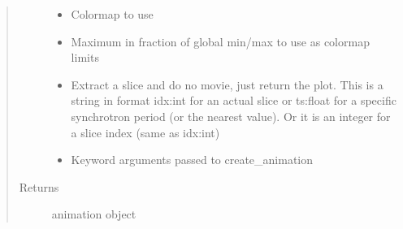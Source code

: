 \documentclass[letterpaper,10pt,openany,oneside,english]{sphinxmanual}
\begin{document}
\begin{fulllineitems}
\begin{fulllineitems}
\begin{quote}
\begin{description}
\begin{itemize}
\item {} 
 \textendash{} Colormap to use

\item {} 
 \textendash{} Maximum in fraction of global min/max to use as colormap limits

\item {} 
 \textendash{} Extract a slice and do no movie, just return the plot. This is a  
string in format idx:int for an actual slice or ts:float for a specific synchrotron  
period (or the nearest value). Or it is an integer for a slice index  
(same as idx:int)

\item {} 
 \textendash{} 
Keyword arguments passed to create\_animation


\end{itemize}

\item[{Returns}] \leavevmode
animation object

\end{description}\end{quote}

\end{fulllineitems}


\end{fulllineitems}

\end{document}

